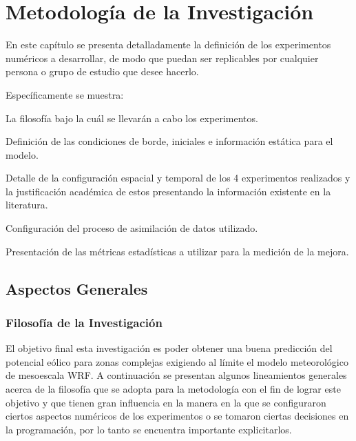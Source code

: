 \chapter{Metodología de la Investigación}
En este capítulo se presenta detalladamente la definición de los experimentos numéricos a desarrollar, de modo que puedan ser replicables por cualquier persona o grupo de estudio que desee hacerlo. 

Específicamente se muestra: 
\begin{itemize*}
	\item La filosofía bajo la cuál se llevarán a cabo los experimentos.
	\item Definición de las condiciones de borde, iniciales e información estática para el modelo.
	\item Detalle de la configuración espacial y temporal de los 4 experimentos realizados y la justificación académica de estos presentando la información existente en la literatura.
	\item Configuración del proceso de asimilación de datos utilizado.
	\item Presentación de las métricas estadísticas a utilizar para la medición de la mejora.
\end{itemize*}
\newpage
\section{Aspectos Generales}
\subsection{Filosofía de la Investigación}
El objetivo final esta investigación es poder obtener una buena predicción del potencial eólico para zonas complejas exigiendo al límite el modelo meteorológico de mesoescala WRF. 
A continuación se presentan algunos lineamientos generales acerca de la filosofía que se adopta para la metodología con el fin de lograr este objetivo y que tienen gran influencia en la manera en la que se configuraron ciertos aspectos numéricos de los experimentos o se tomaron ciertas decisiones en la programación, por lo tanto se encuentra importante explicitarlos.
